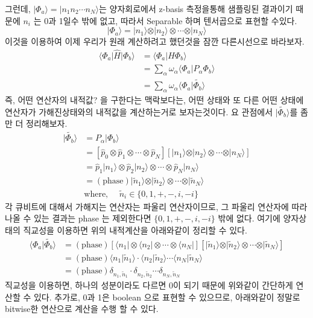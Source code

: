 \documentclass[11pt]{article}
\begin{document}
\begin{enumerate}
  그런데, \(\vert \Phi_a \rangle= \vert n_1 n_2\cdots n_N \rangle \)는 양자회로에서 z-basis 측정을통해 샘플링된 결과이기 때문에 \(n_i\) 는 0과 1일수 밖에 없고, 따라서 Separable 하며 텐서곱으로 표현할 수있다. 
  \[\vert \Phi_a \rangle = \vert n_1 \rangle \otimes \vert n_2 \rangle \otimes \cdots \otimes \vert n_N \rangle \]
  이것을 이용하여 이제 우리가 원래 계산하려고 했던것을 잠깐 다른시선으로 바라보자. 
  \begin{align*}
  \langle \Phi_a \vert \hat{H} \vert \Phi_b \rangle &= \langle \Phi_a \vert \hat{H} \Phi_b \rangle \\
  & = \sum_{\alpha} \omega_{\alpha} \langle \Phi_a \vert P_{\alpha} \Phi_b \rangle \\
  & = \sum_{\alpha} \omega_{\alpha} \langle \Phi_a \vert \tilde{\Phi_b} \rangle
  \end{align*}
  즉, 어떤 연산자의 내적값? 을 구한다는 맥락보다는, 어떤 상태와 또 다른 어떤 상태에 연산자가 가해진상태와의 내적값을 계산하는거로 보자는것이다. 
  요 관점에서 \(\vert \tilde{\Phi_b} \rangle\)를 좀만 더 정리해보자. 
  \begin{align*}
  \vert \tilde{\Phi_b} \rangle &=  P_{\alpha} \vert \Phi_b \rangle \\
  &= \left[\hat{p}_0 \otimes \hat{p}_1 \otimes \cdots \otimes \hat{p}_N\right] \left[\vert n_1 \rangle \otimes \vert n_2 \rangle \otimes \cdots \otimes \vert n_N \rangle\right] \\
  &= \hat{p}_1 \vert n_1 \rangle \otimes \hat{p}_2 \vert n_2 \rangle \otimes \cdots \otimes \hat{p}_N  \vert n_N \rangle \\
  &= \left(\text{phase}\right) \vert \tilde{n}_1 \rangle \otimes \vert \tilde{n}_2 \rangle \otimes \cdots \otimes \vert \tilde{n}_N \rangle \\
  &\text{where, } \quad \tilde{n}_i \in \{0,1,+,-,i,-i\}
  \end{align*}
  각 큐비트에 대해서 가해지는 연산자는 파울리 연산자이므로, 그 파울리 연산자에 따라 나올 수 있는 결과는 phase 는 제외한다면 \(\{0,1,+,-,i,-i\}\) 밖에 없다. 여기에 양자상태의 직교성을 이용하면 위의 내적계산을 아래와같이 정리할 수 있다. 
  \begin{align*}
  \langle \Phi_a \vert \tilde{\Phi_b} \rangle &= \left(\text{phase}\right)\left[\langle n_1 \vert \otimes \langle n_2 \vert \otimes \cdots \otimes \langle n_N \vert\right]
  \left[\vert \tilde{n}_1 \rangle \otimes \vert \tilde{n}_2 \rangle \otimes \cdots \otimes \vert \tilde{n}_N \rangle\right] \\
  & = \left(\text{phase}\right) \langle n_1 \vert \tilde{n}_1 \rangle \cdot \langle n_2 \vert \tilde{n}_2 \rangle \cdots \langle n_N \vert \tilde{n}_N \rangle \\
  & = \left(\text{phase}\right) \delta_{n_1,\tilde{n}_1} \cdot \delta_{n_2,\tilde{n}_2} \cdots \delta_{n_N,\tilde{n}_N}
  \end{align*}
  직교성을 이용하면, 하나의 성분이라도 다르면 0이 되기 때문에 위와같이 간단하게 연산할 수 있다. 추가로, 0과 1은 boolean 으로 표현할 수 있으므로, 아래와같이 정말로 bitwise한 연산으로 계산을 수행 할 수 있다. 


\end{enumerate}
\end{document}
